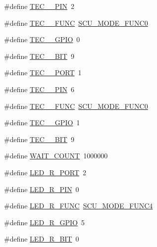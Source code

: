 \begin{DoxyCompactItemize}
\#define \hyperlink{group__samples_gab976c4177676c5c89497cb89480e5dfe}{T\+E\+C\+\_\+\_\+\+P\+IN}~2
\item 
\#define \hyperlink{group__samples_ga0d28555b6255cd5bd89f5618626f044e}{T\+E\+C\+\_\+\_\+\+F\+U\+NC}~\hyperlink{group___s_c_u__18_x_x__43_x_x_gaec79b551b98008d8986e719926f254bc}{S\+C\+U\+\_\+\+M\+O\+D\+E\+\_\+\+F\+U\+N\+C0}
\item 
\#define \hyperlink{group__samples_gae8728c8f2e4279383925ff93a183b407}{T\+E\+C\+\_\+\_\+\+G\+P\+IO}~0
\item 
\#define \hyperlink{group__samples_ga64392cf03fba776f8a9dc238e25ec184}{T\+E\+C\+\_\+\_\+\+B\+IT}~9
\item 
\#define \hyperlink{group__samples_gadd513c832f5c617281c5df0dc67ae80c}{T\+E\+C\+\_\+\_\+\+P\+O\+RT}~1
\item 
\#define \hyperlink{group__samples_ga0b2447cd531de479b88f58f819566522}{T\+E\+C\+\_\+\_\+\+P\+IN}~6
\item 
\#define \hyperlink{group__samples_ga75840b109439b1e90546485e16247097}{T\+E\+C\+\_\+\_\+\+F\+U\+NC}~\hyperlink{group___s_c_u__18_x_x__43_x_x_gaec79b551b98008d8986e719926f254bc}{S\+C\+U\+\_\+\+M\+O\+D\+E\+\_\+\+F\+U\+N\+C0}
\item 
\#define \hyperlink{group__samples_gaa5418f15596d7ada110c4105aa70e561}{T\+E\+C\+\_\+\_\+\+G\+P\+IO}~1
\item 
\#define \hyperlink{group__samples_gac7c8a49f0602d0aeee33923ce8708a4b}{T\+E\+C\+\_\+\_\+\+B\+IT}~9
\item 
\#define \hyperlink{group__samples_ga446e415fc7a5645de4a012cf8a3cdf90}{W\+A\+I\+T\+\_\+\+C\+O\+U\+NT}~1000000
\item 
\#define \hyperlink{group__samples_ga5a11a7cbc215e25401541277460113a4}{L\+E\+D\+\_\+\+R\+\_\+\+P\+O\+RT}~2
\item 
\#define \hyperlink{group__samples_ga22f3cf4ef9dadad8d78d5c59999100b6}{L\+E\+D\+\_\+\+R\+\_\+\+P\+IN}~0
\item 
\#define \hyperlink{group__samples_ga55748801f9d61d2cdab4665b61f73147}{L\+E\+D\+\_\+\+R\+\_\+\+F\+U\+NC}~\hyperlink{group___s_c_u__18_x_x__43_x_x_gaf1b58bdd83fd9b8331aaa1d54420a656}{S\+C\+U\+\_\+\+M\+O\+D\+E\+\_\+\+F\+U\+N\+C4}
\item 
\#define \hyperlink{group__samples_ga938c5edc31fe4ba21d42ac85c739bc9b}{L\+E\+D\+\_\+\+R\+\_\+\+G\+P\+IO}~5
\item 
\#define \hyperlink{group__samples_ga770cf8cc93e5ceb6b347f655d5425f03}{L\+E\+D\+\_\+\+R\+\_\+\+B\+IT}~0
\item 

\end{DoxyCompactItemize}
